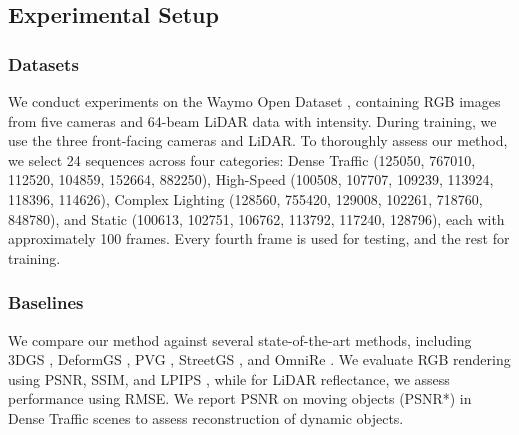 \documentclass[letterpaper, 10 pt, conference]{ieeeconf}  %
\begin{document}
\subsection{Experimental Setup}
\subsubsection{Datasets}

We conduct experiments on the Waymo Open Dataset \cite{ref30}, containing RGB images from five cameras and 64-beam LiDAR data with intensity. During training, we use the three front-facing cameras and LiDAR. To thoroughly assess our method, we select 24 sequences across four  categories: Dense Traffic (125050, 767010, 112520, 104859, 152664, 882250), High-Speed (100508, 107707, 109239, 113924, 118396, 114626), Complex Lighting (128560, 755420, 129008, 102261, 718760, 848780), and Static (100613, 102751, 106762, 113792, 117240, 128796), each with approximately 100 frames. Every fourth frame is used for testing, and the rest for training.

\subsubsection{Baselines}

We compare our method against several state-of-the-art methods, including 3DGS \cite{ref1}, DeformGS \cite{ref12}, PVG \cite{ref9}, StreetGS \cite{ref5}, and OmniRe \cite{ref6}. We evaluate RGB rendering using PSNR, SSIM, and LPIPS \cite{ref33}, while for LiDAR reflectance, we assess performance using RMSE. We report PSNR on moving objects (PSNR*) in Dense Traffic scenes to assess reconstruction of dynamic objects.

\end{document}
